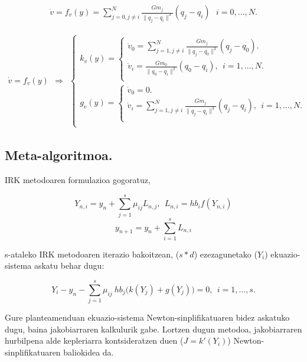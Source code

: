 \begin{align*}
\dot{v}=f_v(y)=\sum_{j=0,j \neq i}^{N} \frac{Gm_j}{\|q_j-q_i\|^3} (q_j-q_i) \ \  \ i=0,\dots,N.
\end{align*}

\begin{align}
\dot{v}=f_v(y) \ \ \Rightarrow \ \ 
\left \{ \begin{array}{c}
  k_v(y)=\left \{ \begin{array}{c}
           \dot{v}_0 =\sum_{j=1,j \neq i}^{N} \frac{Gm_j}{\|q_j-q_0\|^3} (q_j-q_0). \\[.30cm]
           \dot{v}_i = \frac{Gm_0}{\|q_0-q_i\|^3} (q_0-q_i), \ \  i=1,\dots,N.\\[.30cm]
         \end{array} \right. \\[.30cm]  
  g_v(y)=\left \{ \begin{array}{c}
             \dot{v}_0=0. \\[.30cm]
             \dot{v}_i= \sum_{j=1,j \neq i}^{N} \frac{Gm_j}{\|q_j-q_i\|^3} (q_j-q_i), \ \  i=1,\dots,N.\\[.30cm]  
           \end{array} \right. \\ 
\end{array} \right.  
\end{align}


\subsection*{Meta-algoritmoa.}

IRK metodoaren formulazioa gogoratuz,


\begin{equation*}
\label{eq:62}
Y_{n,i}=y_n+ \sum\limits_{j=1}^{s} \mu_{ij} L_{n,j}, \ \ L_{n,i}=hb_if(Y_{n,i})
\end{equation*}
\begin{equation*}
\label{eq:63}
y_{n+1}=y_n+\sum\limits_{i=1}^{s} L_{n,i}
\end{equation*}

s-ataleko IRK metodoaren iterazio bakoitzean, ($s*d$) ezezagunetako ($Y_i$) ekuazio-sistema askatu behar dugu: 

\begin{equation*}
Y_{i}-y_n- \sum\limits_{j=1}^{s} \mu_{ij} \ hb_j \bigg(k(Y_{j})+g(Y_{j})\bigg)=0, \ \ i=1,\dots,s.
\end{equation*}

Gure planteamenduan ekuazio-sistema Newton-sinplifikatuaren bidez askatuko dugu, baina jakobiarraren kalkulurik gabe. Lortzen dugun metodoa, jakobiarraren hurbilpena alde kepleriarra kontsideratzen duen ($J=k'(Y_i)$) Newton-sinplifikatuaren baliokidea da. 

